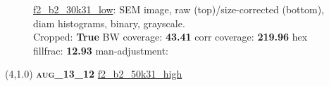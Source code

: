 \begin{figure}[h!]
\label{semimg30}
\caption*{\hyperlink{covtableaug_13_12}{\color{blue} \small \ttfamily f2\_b2\_30k31\_low}: SEM image, raw (top)/size-corrected (bottom), diam histograms, binary, grayscale.\\Cropped: {\bf True} \;\; BW coverage: {\bf 43.41} \:\: corr coverage: {\bf 219.96} \:\: hex fillfrac: {\bf 12.93} \:\: man-adjustment: {\bf \color{blue}{Yes}}}
\end{figure}
\newpage

\begin{textblock}{5}(4,1.0)
{\bf \textsc{aug\_13\_12}}
\hspace{4.5cm}
\hyperlink{covtableaug_13_12}{\color{blue} \large \ttfamily f2\_b2\_50k31\_high}
\end{textblock}

